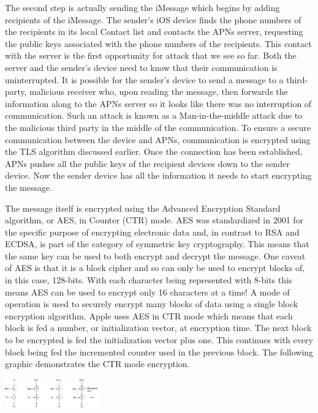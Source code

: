 The second step is actually sending the iMessage which begins by adding recipients of the iMessage.  The sender's iOS device finds the phone numbers of the recipients in its local Contact list and contacts the APNs server, requesting the public keys associated with the phone numbers of the recipients.  This contact with the server is the first opportunity for attack that we see so far.  Both the server and the sender's device need to know that their communication is uninterrupted.  It is possible for the sender's device to send a message to a third-party, malicious receiver who, upon reading the message, then forwards the information along to the APNs server so it looks like there was no interruption of communication.  Such an attack is known as a Man-in-the-middle attack due to the malicious third party in the middle of the communication.  To ensure a secure communication between the device and APNs, communication is encrypted using the TLS algorithm discussed earlier.  Once the connection has been established, APNs pushes all the public keys of the recipient devices down to the sender device.  Now the sender device has all the information it needs to start encrypting the message.

The message itself is encrypted using the Advanced Encryption Standard algorithm, or AES, in Counter (CTR) mode.  AES was standardized in 2001 for the specific purpose of encrypting electronic data and, in contrast to RSA and ECDSA, is part of the category of symmetric key cryptography.  This means that the same key can be used to both encrypt and decrypt the message.  One caveat of AES is that it is a block cipher and so can only be used to encrypt blocks of, in this case, 128-bits.  With each character being represented with 8-bits this means AES can be used to encrypt only 16 characters at a time!  A mode of operation is used to securely encrypt many blocks of data using a single block encryption algorithm.  Apple uses AES in CTR mode which means that each block is fed a number, or initialization vector, at encryption time.  The next block to be encrypted is fed the initialization vector plus one.  This continues with every block being fed the incremented counter used in the previous block.  The following graphic demonstrates the CTR mode encryption.

\begin{center}
    \includegraphics[width=0.3\textwidth]{ctr.jpg}
\end{center}

